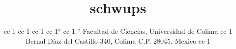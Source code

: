 \documentclass[11pt]{article}
\begin{document}
  
    
    
    
    \author{  cc 1  cc 1  cc 1  cc 1$^a$  cc 1
\normalsize{$^a$ Facultad de Ciencias, Universidad de Colima}  cc 1
\vspace{0.3cm}

\normalsize{Bernal D\'iaz del Castillo 340, Colima C.P. 28045, Mexico}  cc 1}

    

    

    

    \title{schwups}

    

    

    

    \maketitle











  
\end{document}
